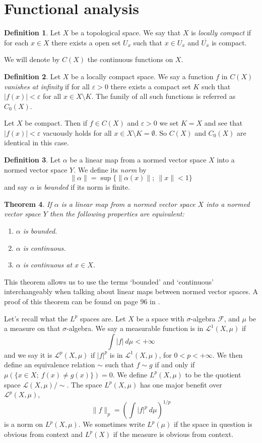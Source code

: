 \documentclass[a4paper,12pt,twoside,BCOR=10mm]{scrbook}
\newtheorem{theorem}{Theorem}[section]
\theoremstyle{definition}
\theoremstyle{definition}
\theoremstyle{definition}
\newtheorem{definition}[theorem]{Definition}
\begin{document}
\section{Functional analysis}
\begin{definition}
\label{index10}
Let $X$ be a topological space.
We say that $X$ is \emph{locally compact} if for each $x \in X$ there exists a open set $U_x$ such that $x \in U_x$ and $\overline{U_x}$ is compact.
\end{definition}
\label{index11}
We will denote by $C(X)$ the continuous functions on $X$.
\begin{definition}
\label{index12}
Let $X$ be a locally compact space.
We say a function $f$ in $C(X)$ \emph{vanishes at infinity} if for all $\varepsilon > 0$ there exists a compact set $K$ such that $|f(x)| < \varepsilon$ for all $x \in X \setminus K$.
The family of all such functions is referred as $C_0(X)$.
\end{definition}
Let $X$ be compact.
Then if $f \in C(X)$ and $\varepsilon > 0$ we set $K = X$ and see that $|f(x)| < \varepsilon$ vacuously holds for all $x \in X \setminus K = \emptyset$.
So $C(X)$ and $C_0(X)$ are identical in this case.
\begin{definition}
\label{index13}
Let $\alpha$ be a linear map from a normed vector space $X$ into a normed vector space $Y$.
We define its \emph{norm} by
\[
	\|\alpha\| = \sup\{\|\alpha(x)\|;\ \|x\| < 1\}
\]
and say $\alpha$ is \emph{bounded} if its norm is finite.
\end{definition}
\begin{theorem}
If $\alpha$ is a linear map from a normed vector space $X$ into a normed vector space $Y$ then the following properties are equivalent:
\begin{enumerate}
\item[\emph{(i)}] $\alpha$ is bounded.
\item[\emph{(ii)}] $\alpha$ is continuous.
\item[\emph{(iii)}] $\alpha$ is continuous at $x \in X$.
\end{enumerate}
\end{theorem}
This theorem allows us to use the terms `bounded' and `continuous' interchangeably when talking about linear maps between normed vector spaces.
A proof of this theorem can be found on page $96$ in \citep{rudin2}.

\label{index14}
Let's recall what the $L^p$ spaces are.
Let $X$ be a space with $\sigma$-algebra $\mathcal{F}$, and $\mu$ be a measure on that $\sigma$-algebra.
We say a measurable function is in $\mathcal{L}^1(X, \mu)$ if
\[
	\int |f|\ d\mu < +\infty
\]
and we say it is $\mathcal{L}^p(X, \mu)$ if $|f|^p$ is in $\mathcal{L}^1(X, \mu)$, for $0 < p < +\infty$.
We then define an equivalence relation $\sim$ such that $f \sim g$ if and only if $\mu(\{x \in X;\ f(x) \neq g(x)\}) = 0$.
We define $L^p(X, \mu)$ to be the quotient space $\mathcal{L}(X, \mu)/\sim$.
The space $L^p(X, \mu)$ has one major benefit over $\mathcal{L}^p(X, \mu)$,
\[
\label{index15}
	\|f\|_p = 
	\left ( \int |f|^p\ d\mu \right )^{1/p}
\]
is a norm on $L^p(X, \mu)$.
We sometimes write $L^p(\mu)$ if the space in question is obvious from context and $L^p(X)$ if the measure is obvious from context.
\end{document}
